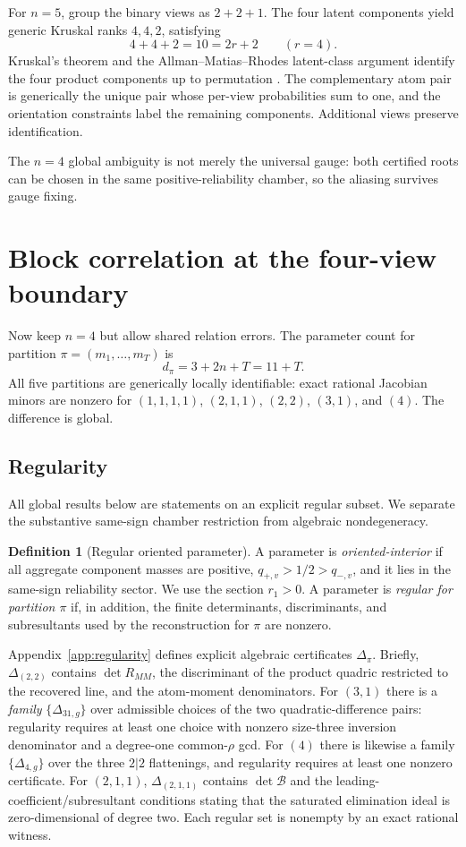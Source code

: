 \documentclass[11pt]{article}
\theoremstyle{definition}
\newtheorem{definition}[theorem]{Definition}
\theoremstyle{remark}
\begin{document}
For $n=5$, group the binary views as $2+2+1$. The four latent components yield generic Kruskal ranks $4,4,2$, satisfying
\[
4+4+2=10=2r+2\qquad(r=4).
\]
Kruskal's theorem and the Allman--Matias--Rhodes latent-class argument identify the four product components up to permutation \cite{kruskal1977,allman2009}. The complementary atom pair is generically the unique pair whose per-view probabilities sum to one, and the orientation constraints label the remaining components. Additional views preserve identification.

The $n=4$ global ambiguity is not merely the universal gauge: both certified roots can be chosen in the same positive-reliability chamber, so the aliasing survives gauge fixing.

\section{Block correlation at the four-view boundary}
\label{sec:block}

Now keep $n=4$ but allow shared relation errors. The parameter count for partition $\pi=(m_1,\ldots,m_T)$ is
\[
d_\pi=3+2n+T=11+T.
\]
All five partitions are generically locally identifiable: exact rational Jacobian minors are nonzero for $(1,1,1,1)$, $(2,1,1)$, $(2,2)$, $(3,1)$, and $(4)$. The difference is global.

\subsection{Regularity}

All global results below are statements on an explicit regular subset. We separate the substantive same-sign chamber restriction from algebraic nondegeneracy.

\begin{definition}[Regular oriented parameter]
A parameter is \emph{oriented-interior} if all aggregate component masses are positive, $q_{+,v}>1/2>q_{-,v}$, and it lies in the same-sign reliability sector. We use the section $r_1>0$.
A parameter is \emph{regular for partition $\pi$} if, in addition, the finite determinants, discriminants, and subresultants used by the reconstruction for $\pi$ are nonzero.
\end{definition}

Appendix~\ref{app:regularity} defines explicit algebraic certificates $\Delta_\pi$. Briefly, $\Delta_{(2,2)}$ contains $\det R_{MM}$, the discriminant of the product quadric restricted to the recovered line, and the atom-moment denominators. For $(3,1)$ there is a \emph{family} $\{\Delta_{31,g}\}$ over admissible choices of the two quadratic-difference pairs: regularity requires at least one choice with nonzero size-three inversion denominator and a degree-one common-$\rho$ gcd. For $(4)$ there is likewise a family $\{\Delta_{4,g}\}$ over the three $2|2$ flattenings, and regularity requires at least one nonzero certificate. For $(2,1,1)$, $\Delta_{(2,1,1)}$ contains $\det\mathcal B$ and the leading-coefficient/subresultant conditions stating that the saturated elimination ideal is zero-dimensional of degree two. Each regular set is nonempty by an exact rational witness.
\end{document}
